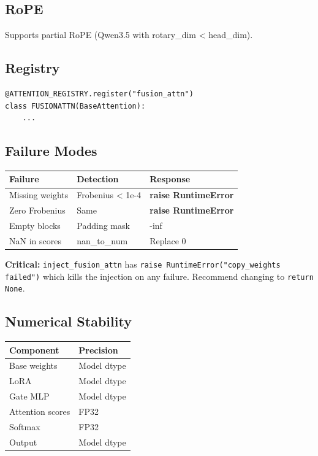 \subsection{RoPE}

Supports partial RoPE (Qwen3.5 with rotary\_dim < head\_dim).

\subsection{Registry}

\begin{lstlisting}
@ATTENTION_REGISTRY.register("fusion_attn")
class FUSIONATTN(BaseAttention):
    ...
\end{lstlisting}

\subsection{Failure Modes}

\begin{table}[H]
\centering
\small
\begin{tabular}{lll}
\toprule
\textbf{Failure} & \textbf{Detection} & \textbf{Response} \\
\midrule
Missing weights & Frobenius < 1e-4 & \textbf{raise RuntimeError} \\
Zero Frobenius & Same & \textbf{raise RuntimeError} \\
Empty blocks & Padding mask & -inf \\
NaN in scores & nan\_to\_num & Replace 0 \\
\bottomrule
\end{tabular}
\end{table}

\textbf{   Critical:} \texttt{inject\_fusion\_attn} has \texttt{raise RuntimeError("copy\_weights failed")} 
which kills the injection on any failure. Recommend changing to \texttt{return None}.

\subsection{Numerical Stability}

\begin{table}[H]
\centering
\small
\begin{tabular}{ll}
\toprule
\textbf{Component} & \textbf{Precision} \\
\midrule
Base weights & Model dtype \\
LoRA & Model dtype \\
Gate MLP & Model dtype \\
Attention scores & FP32 \\
Softmax & FP32 \\
Output & Model dtype \\
\bottomrule
\end{tabular}
\end{table}



